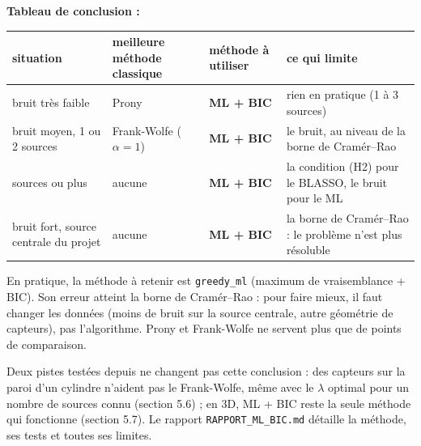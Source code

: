 \documentclass[
  french,
]{article}
\newcounter{none} %
\begin{document}
\textbf{Tableau de conclusion :}

{\def\LTcaptype{none} %
\begin{longtable}[]{@{}
  >{\raggedright\arraybackslash}p{}
  >{\raggedright\arraybackslash}p{}
  >{\raggedright\arraybackslash}p{}
  >{\raggedright\arraybackslash}p{}@{}}
\toprule\noalign{}
\begin{minipage}[b]{\linewidth}\raggedright
situation
\end{minipage} & \begin{minipage}[b]{\linewidth}\raggedright
meilleure méthode classique
\end{minipage} & \begin{minipage}[b]{\linewidth}\raggedright
méthode à utiliser
\end{minipage} & \begin{minipage}[b]{\linewidth}\raggedright
ce qui limite
\end{minipage} \\
\midrule\noalign{}
\endhead
\bottomrule\noalign{}
\endlastfoot
bruit très faible & Prony & \textbf{ML + BIC} & rien en pratique (1 à 3
sources) \\
bruit moyen, 1 ou 2 sources & Frank-Wolfe (\(\alpha = 1\)) & \textbf{ML
+ BIC} & le bruit, au niveau de la borne de Cramér--Rao \\
3 sources ou plus & aucune & \textbf{ML + BIC} & la condition (H2) pour
le BLASSO, le bruit pour le ML \\
bruit fort, source centrale du projet & aucune & \textbf{ML + BIC} & la
borne de Cramér--Rao : le problème n'est plus résoluble \\
\end{longtable}
}

En pratique, la méthode à retenir est \texttt{greedy\_ml} (maximum de
vraisemblance + BIC). Son erreur atteint la borne de Cramér--Rao : pour
faire mieux, il faut changer les données (moins de bruit sur la source
centrale, autre géométrie de capteurs), pas l'algorithme. Prony et
Frank-Wolfe ne servent plus que de points de comparaison.

Deux pistes testées depuis ne changent pas cette conclusion : des
capteurs sur la paroi d'un cylindre n'aident pas le Frank-Wolfe, même
avec le \(\lambda\) optimal pour un nombre de sources connu (section
5.6) ; en 3D, ML + BIC reste la seule méthode qui fonctionne (section
5.7). Le rapport \texttt{RAPPORT\_ML\_BIC.md} détaille la méthode, ses
tests et toutes ses limites.
\end{document}
